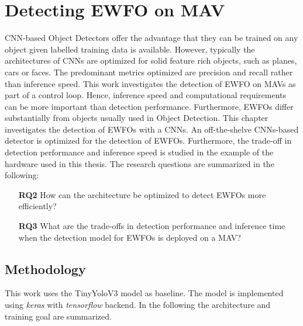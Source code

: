	\chapter{Detecting \ac{EWFO} on \ac{MAV}}
	\label{sec:object_detection}
	
	\ac{CNN}-based Object Detectors offer the advantage that they can be trained on any object given labelled training data is available. However, typically the architectures of \acp{CNN} are optimized for solid feature rich objects, such as planes, cars or faces. The predominant metrics optimized are precision and recall rather than inference speed. This work investigates the detection of \ac{EWFO} on \acp{MAV} as part of a control loop. Hence, inference speed and computational requirements can be more important than detection performance. Furthermore, \acp{EWFO} differ substantially from objects usually used in Object Detection. This chapter investigates the detection of \acp{EWFO} with a \acp{CNN}. An off-the-shelve \acp{CNN}-based detector is optimized for the detection of \acp{EWFO}. Furthermore, the trade-off in detection performance and inference speed is studied in the example of the hardware used in this thesis. The research questions are summarized in the following:
	
\begin{enumerate}
	\item[\textbf{RQ2}]How can the architecture be optimized to detect \acp{EWFO} more efficiently?
	\item[\textbf{RQ3}]What are the trade-offs in detection performance and inference time when the detection model for \acp{EWFO} is deployed on a \ac{MAV}?
\end{enumerate}

	\section{Methodology}
		
	This work uses the TinyYoloV3 model as baseline. The model is implemented using \textit{keras} with \textit{tensorflow} backend. In the following the architecture and training goal are summarized.
	
